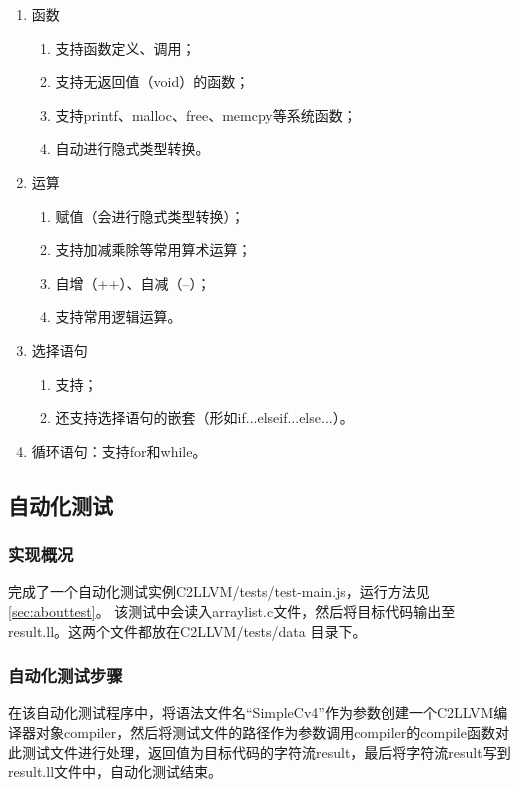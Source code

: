 \documentclass[a4paper]{article}
\begin{document}
\begin{CJK*}{UTF8}{gbsn}
\begin{enumerate}
        \item 函数
        \begin{enumerate}
            \item 支持函数定义、调用；
            \item 支持无返回值（void）的函数；
            \item 支持printf、malloc、free、memcpy等系统函数；
            \item 自动进行隐式类型转换。
        \end{enumerate}
        
        \item 运算
        \begin{enumerate}
            \item 赋值（会进行隐式类型转换）；
            \item 支持加减乘除等常用算术运算；
            \item 自增（++）、自减（--）；
            \item 支持常用逻辑运算。
        \end{enumerate}

        \item 选择语句
        \begin{enumerate}
            \item 支持；
            \item 还支持选择语句的嵌套（形如if...else{if...else...}）。
        \end{enumerate}

        \item 循环语句：支持for和while。
    \end{enumerate}

    \subsection{自动化测试}
    \subsubsection{实现概况}
    完成了一个自动化测试实例C2LLVM/tests/test-main.js，运行方法见\ref{sec:abouttest}。 该测试中会读入arraylist.c文件，然后将目标代码输出至result.ll。这两个文件都放在C2LLVM/tests/data 目录下。

    \subsubsection{自动化测试步骤}
    在该自动化测试程序中，将语法文件名“SimpleCv4”作为参数创建一个C2LLVM编译器对象compiler，然后将测试文件的路径作为参数调用compiler的compile函数对此测试文件进行处理，返回值为目标代码的字符流result，最后将字符流result写到result.ll文件中，自动化测试结束。


\end{CJK*}
\end{document}
